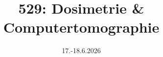 
\usepackage[headsepline=true,markcase=upper]{scrlayer-scrpage}

\title{529: Dosimetrie \& Computertomographie}

\date{17.-18.6.2026}





\maketitle

\tableofcontents










\printbibliography


